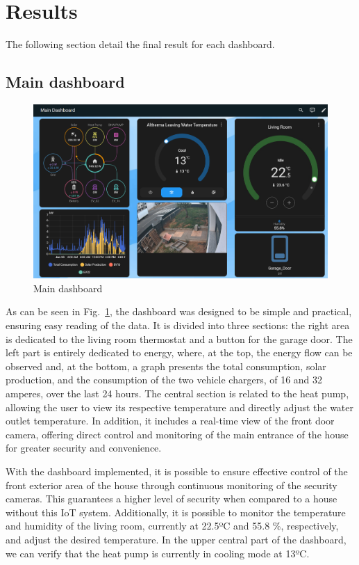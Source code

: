 \documentclass[graybox]{svmult}
\begin{document}
\section{Results}\label{sec:Results}
The following section detail the final result for each dashboard. 
\subsection{Main dashboard}

\begin{figure}[H] 
	\centering
	\includegraphics[width=\textwidth]{main.png}
	\caption{Main dashboard}
	\label{fig:main.png}
\end{figure}

As can be seen in Fig.~\ref{fig:main.png}, the dashboard was designed to be simple and practical, ensuring easy reading of the data. It is divided into three sections: the right area is dedicated to the living room thermostat and a button for the garage door. The left part is entirely dedicated to energy, where, at the top, the energy flow can be observed and, at the bottom, a graph presents the total consumption, solar production, and the consumption of the two vehicle chargers, of 16 and 32 amperes, over the last 24 hours. The central section is related to the heat pump, allowing the user to view its respective temperature and directly adjust the water outlet temperature. In addition, it includes a real-time view of the front door camera, offering direct control and monitoring of the main entrance of the house for greater security and convenience.

With the dashboard implemented, it is possible to ensure effective control of the front exterior area of the house through continuous monitoring of the security cameras. This guarantees a higher level of security when compared to a house without this IoT system. Additionally, it is possible to monitor the temperature and humidity of the living room, currently at 22.5ºC and 55.8 \%, respectively, and adjust the desired temperature. In the upper central part of the dashboard, we can verify that the heat pump is currently in cooling mode at 13ºC.
\end{document}
